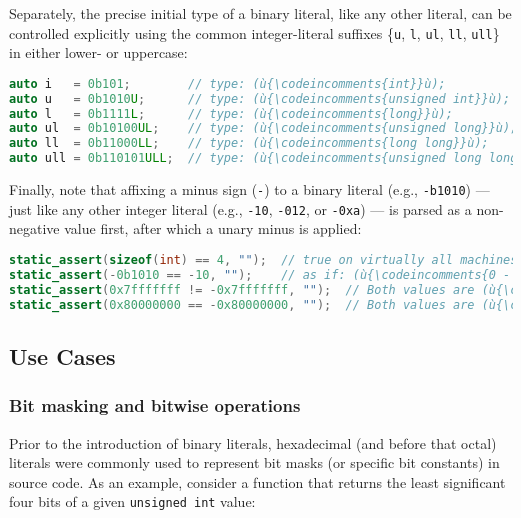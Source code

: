 \noindent Separately, the precise initial type of a binary literal, like any other
literal, can be controlled explicitly using the common integer-literal
suffixes \{\texttt{u}, \texttt{l}, \texttt{ul}, \texttt{ll},
\texttt{ull}\} in either lower- or uppercase:

\begin{lstlisting}[language=C++]
auto i   = 0b101;        // type: (ù{\codeincomments{int}}ù);                 value: 5
auto u   = 0b1010U;      // type: (ù{\codeincomments{unsigned int}}ù);        value: 10
auto l   = 0b1111L;      // type: (ù{\codeincomments{long}}ù);                value: 15
auto ul  = 0b10100UL;    // type: (ù{\codeincomments{unsigned long}}ù);       value: 20
auto ll  = 0b11000LL;    // type: (ù{\codeincomments{long long}}ù);           value: 24
auto ull = 0b110101ULL;  // type: (ù{\codeincomments{unsigned long long}}ù);  value: 53
\end{lstlisting}
    

\noindent Finally, note that affixing a minus sign (\texttt{-}) to a binary
literal (e.g., \texttt{-b1010}) --- just like any other integer literal
(e.g., \texttt{-10}, \texttt{-012}, or \texttt{-0xa}) --- is parsed as a
non-negative value first, after which a unary minus is applied:

\begin{lstlisting}[language=C++]
static_assert(sizeof(int) == 4, "");  // true on virtually all machines today
static_assert(-0b1010 == -10, "");    // as if: (ù{\codeincomments{0 - 0b1010 == 0 - 10}}ù)
static_assert(0x7fffffff != -0x7fffffff, "");  // Both values are (ù{\codeincomments{signed int}}ù).
static_assert(0x80000000 == -0x80000000, "");  // Both values are (ù{\codeincomments{unsigned int}}ù).
\end{lstlisting}
    

\subsection[Use Cases]{Use Cases}\label{use-cases}

\subsubsection[Bit masking and bitwise operations]{Bit masking and bitwise operations}\label{bit-masking-and-bitwise-operations}

Prior to the introduction of binary literals, hexadecimal (and before
that octal) literals were commonly used to represent bit masks (or
specific bit constants) in source code. As an example, consider a
function that returns the least significant four bits of a given
\texttt{unsigned}~\texttt{int} value:

